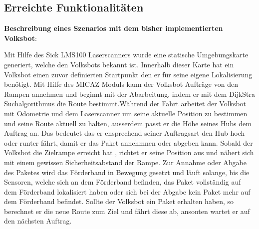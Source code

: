\subsection{Erreichte Funktionalitäten}

\textbf{Beschreibung eines Szenarios mit dem bisher implementierten Volksbot}:

Mit Hilfe des Sick LMS100 Laserscanners wurde eine statische Umgebungskarte generiert, welche den Volksbots bekannt ist. Innerhalb dieser Karte hat ein Volksbot einen zuvor definierten Startpunkt den er für seine eigene Lokalisierung benötigt. Mit Hilfe des MICAZ Moduls kann der Volksbot Aufträge von den Rampen annehmen und beginnt mit der Abarbeitung, indem er mit dem DijkStra Suchalgorithmus die Route bestimmt.Während der Fahrt arbeitet der Volksbot mit Odometrie und dem Laserscanner um seine aktuelle Position zu bestimmen und seine Route aktuell zu halten, ausserdem passt er die Höhe seines Hubs dem Auftrag an. Das bedeutet das er ensprechend seiner Auftragsart den Hub hoch oder runter fährt, damit er das Paket annehmnen oder abgeben kann. Sobald der Volksbot die Zielrampe erreicht hat , richtet er seine Position aus und nähert sich mit einem gewissen Sicherheitsabstand der Rampe. Zur Annahme oder Abgabe des Paketes wird das Förderband in Bewegung gesetzt und läuft solange, bis die Sensoren, welche sich an dem Förderband befinden, das Paket vollständig auf dem Förderband lokalisiert haben oder sich bei der Abgabe kein Paket mehr auf dem Förderband befindet. Sollte der Volksbot ein Paket erhalten haben, so berechnet er die neue Route zum Ziel und fährt diese ab, ansonten wartet er auf den nächsten Auftrag.